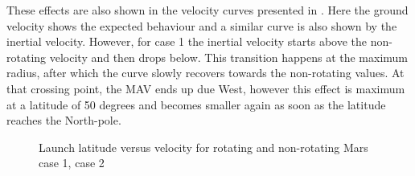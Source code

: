 \noindent
These effects are also shown in the velocity curves presented in . Here the ground velocity shows the expected behaviour and a similar curve is also shown by the inertial velocity. However, for case 1 the inertial velocity starts above the non-rotating velocity and then drops below. This transition happens at the maximum radius, after which the curve slowly recovers towards the non-rotating values. At that crossing point, the \ac{MAV} ends up due West, however this effect is maximum at a latitude of 50 degrees and becomes smaller again as soon as the latitude reaches the North-pole.

\begin{figure}[H]
\centering
{} 
\caption{Launch latitude versus velocity for rotating and non-rotating Mars \protect{} case 1,  \protect{} case 2 } 
\label{fig:launchLatitudeVsVelocityCase1combined} 
\end{figure}




